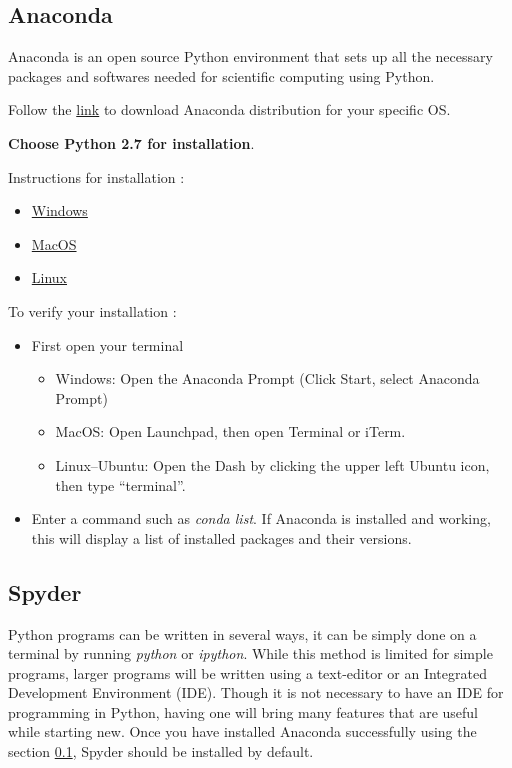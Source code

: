 \documentclass{cmc}
\begin{document}
\subsection{Anaconda}
\label{subsec:anaconda}
Anaconda is an open source Python environment that sets up all the necessary
packages and softwares needed for scientific computing using Python.

Follow the \href{https://www.anaconda.com/download/}{link} to download Anaconda
distribution for your specific OS.

\textbf{Choose Python 2.7 for installation}.

Instructions for installation :

\begin{itemize}
\item \href{{https://docs.anaconda.com/anaconda/install/windows}}{Windows}
\item \href{https://docs.anaconda.com/anaconda/install/mac-os}{MacOS}
\item \href{https://docs.anaconda.com/anaconda/install/linux}{Linux}
\end{itemize}

To verify your installation :

\begin{itemize}
\item First open your terminal
  \begin{itemize}
  \item Windows: Open the Anaconda Prompt (Click Start, select Anaconda Prompt)
  \item MacOS: Open Launchpad, then open Terminal or iTerm.
  \item Linux–Ubuntu: Open the Dash by clicking the upper left Ubuntu icon, then
    type “terminal”.
  \end{itemize}
\item Enter a command such as \textit{conda list}. If Anaconda is installed and
  working, this will display a list of installed packages and their versions.
\end{itemize}

\subsection{Spyder}

Python programs can be written in several ways, it can be simply done on a
terminal by running \textit{python} or \textit{ipython}. While this method is
limited for simple programs, larger programs will be written using a text-editor
or an Integrated Development Environment (IDE).  Though it is not necessary to
have an IDE for programming in Python, having one will bring many features that
are useful while starting new. Once you have installed Anaconda successfully
using the section \ref{subsec:anaconda}, Spyder should be installed by default.
\end{document}
